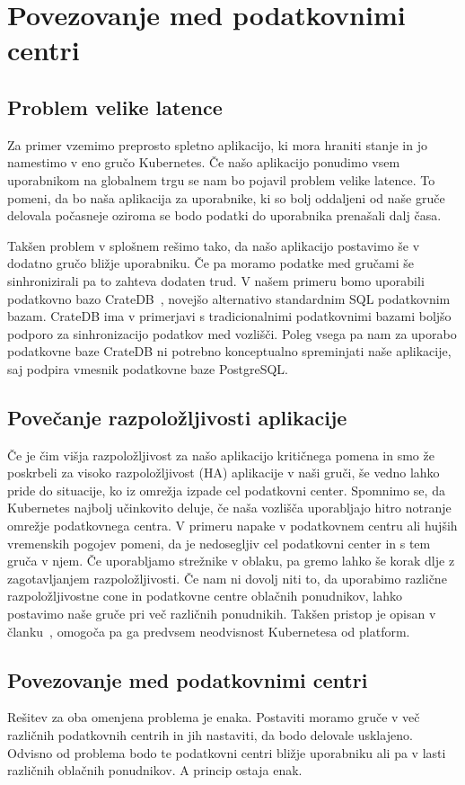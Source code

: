 \documentclass[a4paper, 12pt]{book}
\begin{document}
\chapter{Povezovanje med podatkovnimi centri}
\label{povezovanje-med-centri}
\section{Problem velike latence}
Za primer vzemimo preprosto spletno aplikacijo, ki mora hraniti stanje in jo namestimo v eno gručo Kubernetes.
Če našo aplikacijo ponudimo vsem uporabnikom na globalnem trgu se nam bo pojavil problem velike latence.
To pomeni, da bo naša aplikacija za uporabnike, ki so bolj oddaljeni od naše gruče delovala počasneje oziroma se bodo podatki do uporabnika prenašali dalj časa.

Takšen problem v splošnem rešimo tako, da našo aplikacijo postavimo še v dodatno gručo bližje uporabniku. 
Če pa moramo podatke med gručami še sinhronizirali pa to zahteva dodaten trud.
V našem primeru bomo uporabili podatkovno bazo CrateDB~\cite{cratedb}, novejšo alternativo standardnim SQL podatkovnim bazam.
CrateDB ima v primerjavi s tradicionalnimi podatkovnimi bazami boljšo podporo za sinhronizacijo podatkov med vozlišči.
Poleg vsega pa nam za uporabo podatkovne baze CrateDB ni potrebno konceptualno spreminjati naše aplikacije, saj podpira vmesnik podatkovne baze PostgreSQL.
\section{Povečanje razpoložljivosti aplikacije}
Če je čim višja razpoložljivost za našo aplikacijo kritičnega pomena in smo že poskrbeli za visoko razpoložljivost (HA) aplikacije v naši gruči, še vedno lahko pride do situacije, ko iz omrežja izpade cel podatkovni center.
Spomnimo se, da Kubernetes najbolj učinkovito deluje, če naša vozlišča uporabljajo hitro notranje omrežje podatkovnega centra.
V primeru napake v podatkovnem centru ali hujših vremenskih pogojev pomeni, da je nedosegljiv cel podatkovni center in s tem gruča v njem.
Če uporabljamo strežnike v oblaku, pa gremo lahko še korak dlje z zagotavljanjem razpoložljivosti.
Če nam ni dovolj niti to, da uporabimo različne razpoložljivostne cone in podatkovne centre oblačnih ponudnikov, lahko postavimo naše gruče pri več različnih ponudnikih.
Takšen pristop je opisan v članku~\cite{tosca-fed}, omogoča pa ga predvsem neodvisnost Kubernetesa od platform.
\section{Povezovanje med podatkovnimi centri}
Rešitev za oba omenjena problema je enaka.
Postaviti moramo gruče v več različnih podatkovnih centrih in jih nastaviti, da bodo delovale usklajeno.
Odvisno od problema bodo te podatkovni centri bližje uporabniku ali pa v lasti različnih oblačnih ponudnikov.
A princip ostaja enak.
\end{document}
